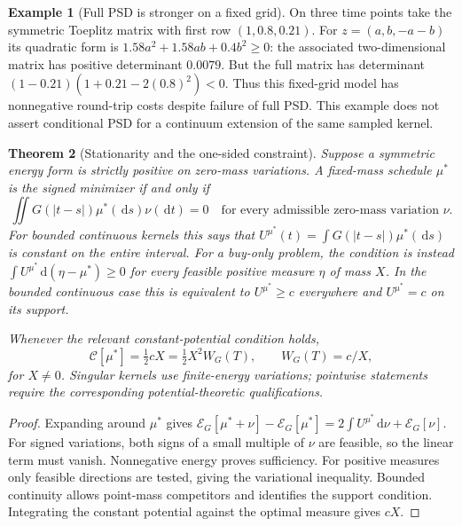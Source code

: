 \documentclass[11pt]{article}
\numberwithin{equation}{section}
\newtheorem{theorem}{Theorem}[section]
\theoremstyle{definition}
\theoremstyle{remark}
\theoremstyle{definition}
\newtheorem{example}[theorem]{Example}
\newcommand{\dd}{\,\mathrm d}
\begin{document}
\begin{example}[Full PSD is stronger on a fixed grid]
On three time points take the symmetric Toeplitz matrix with first row
$(1,0.8,0.21)$. For $z=(a,b,-a-b)$ its quadratic form is
$1.58a^2+1.58ab+0.4b^2\geq0$: the associated two-dimensional matrix has
positive determinant $0.0079$. But the full matrix has determinant
$(1-0.21)(1+0.21-2(0.8)^2)<0$. Thus this fixed-grid model has nonnegative
round-trip costs despite failure of full PSD. This example does not assert
conditional PSD for a continuum extension of the same sampled kernel.
\end{example}

\begin{theorem}[Stationarity and the one-sided constraint]\label{thm:equilibrium}
Suppose a symmetric energy form is strictly positive on zero-mass variations.
A fixed-mass schedule $\mu^*$ is the signed minimizer if and only if
\begin{equation}\label{eq:equil}
 \iint G(|t-s|)\mu^*(\dd s)\nu(\dd t)=0
 \quad\text{for every admissible zero-mass variation }\nu.
\end{equation}
For bounded continuous kernels this says that
$U^{\mu^*}(t)=\int G(|t-s|)\mu^*(\dd s)$ is constant on the entire interval.
For a buy-only problem, the condition is instead
$\int U^{\mu^*}\dd(\eta-\mu^*)\geq0$ for every feasible positive measure
$\eta$ of mass $X$. In the bounded continuous case this is equivalent to
$U^{\mu^*}\geq c$ everywhere and $U^{\mu^*}=c$ on its support.

Whenever the relevant constant-potential condition holds,
\begin{equation}\label{eq:mincost}
 \mathcal C[\mu^*]=\tfrac12cX=\tfrac12X^2W_G(T),\qquad W_G(T)=c/X,
\end{equation}
for $X\ne0$. Singular kernels use finite-energy variations; pointwise
statements require the corresponding potential-theoretic qualifications.
\end{theorem}
\begin{proof}
Expanding around $\mu^*$ gives
$\mathcal E_G[\mu^*+\nu]-\mathcal E_G[\mu^*]
=2\int U^{\mu^*}\dd\nu+\mathcal E_G[\nu]$.
For signed variations, both signs of a small multiple of $\nu$ are feasible,
so the linear term must vanish. Nonnegative energy proves sufficiency.
For positive measures only feasible directions are tested, giving the
variational inequality. Bounded continuity allows point-mass competitors and
identifies the support condition. Integrating the constant potential against
the optimal measure gives $cX$.
\end{proof}
\end{document}
